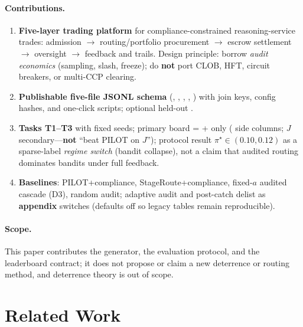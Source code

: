 \documentclass[sigconf,review]{acmart}
\newcommand{\pistar}{\pi^\star}
\begin{document}
\paragraph{Contributions.}
\begin{enumerate}
\item \textbf{Five-layer trading platform} for compliance-constrained reasoning-service trades: admission $\rightarrow$ routing/portfolio procurement $\rightarrow$ escrow settlement $\rightarrow$ oversight $\rightarrow$ feedback and trails. Design principle: borrow \emph{audit economics} (sampling, slash, freeze); do \textbf{not} port CLOB, HFT, circuit breakers, or multi-CCP clearing.
\item \textbf{Publishable five-file JSONL schema} (, , , , ) with join keys, config hashes, and one-click scripts; optional held-out .
\item \textbf{Tasks T1--T3} with fixed seeds; primary board =  +  only ( side columns; $J$ secondary---\textbf{not} ``beat PILOT on $J$''); protocol result $\pistar \in (0.10, 0.12)$ as a sparse-label \emph{regime switch} (bandit collapse), not a claim that audited routing dominates bandits under full feedback.
\item \textbf{Baselines}: PILOT+compliance, StageRoute+compliance, fixed-$a$ audited cascade (D3), random audit; adaptive audit and post-catch delist as \textbf{appendix} switches (defaults off so legacy tables remain reproducible).
\end{enumerate}

\paragraph{Scope.} This paper contributes the generator, the evaluation protocol, and the leaderboard contract; it does not propose or claim a new deterrence or routing method, and deterrence theory is out of scope.

\section{Related Work}
\label{sec:related}
\end{document}
